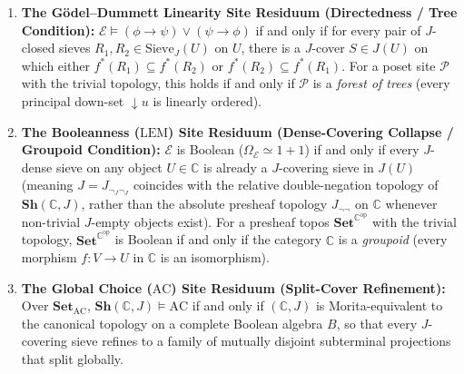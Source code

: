 \begin{theorem}
\begin{enumerate}
  \item \textbf{The Gödel--Dummett Linearity Site Residuum (Directedness / Tree Condition):} $\mathcal{E} \models (\phi \to \psi) \vee (\psi \to \phi)$ if and only if for every pair of $J$-closed sieves $R_1, R_2 \in \mathrm{Sieve}_J(U)$ on $U$, there is a $J$-cover $S \in J(U)$ on which either $f^*(R_1) \subseteq f^*(R_2)$ or $f^*(R_2) \subseteq f^*(R_1)$. For a poset site $\mathcal{P}$ with the trivial topology, this holds if and only if $\mathcal{P}$ is a \emph{forest of trees} (every principal down-set ${\downarrow} u$ is linearly ordered).

  \item \textbf{The Booleanness ($\mathrm{LEM}$) Site Residuum (Dense-Covering Collapse / Groupoid Condition):} $\mathcal{E}$ is Boolean ($\Omega_{\mathcal{E}} \simeq 1+1$) if and only if every $J$-dense sieve on any object $U \in \mathbb{C}$ is already a $J$-covering sieve in $J(U)$ (meaning $J = J_{\neg_J \neg_J}$ coincides with the relative double-negation topology of $\mathbf{Sh}(\mathbb{C}, J)$, rather than the absolute presheaf topology $J_{\neg\neg}$ on $\mathbb{C}$ whenever non-trivial $J$-empty objects exist). For a presheaf topos $\mathbf{Set}^{\mathbb{C}^{\mathrm{op}}}$ with the trivial topology, $\mathbf{Set}^{\mathbb{C}^{\mathrm{op}}}$ is Boolean if and only if the category $\mathbb{C}$ is a \emph{groupoid} (every morphism $f: V \to U$ in $\mathbb{C}$ is an isomorphism).

  \item \textbf{The Global Choice ($\mathrm{AC}$) Site Residuum (Split-Cover Refinement):} Over $\mathbf{Set}_{\mathrm{AC}}$, $\mathbf{Sh}(\mathbb{C}, J) \models \mathrm{AC}$ if and only if $(\mathbb{C}, J)$ is Morita-equivalent to the canonical topology on a complete Boolean algebra $B$, so that every $J$-covering sieve refines to a family of mutually disjoint subterminal projections that split globally.

\end{enumerate}

\end{theorem}

